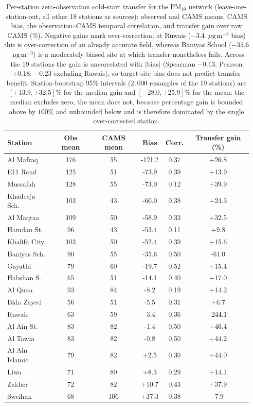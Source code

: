 \documentclass[11pt]{article}
\newcommand*{\ugm}{\ensuremath{\mu\mathrm{g\,m^{-3}}}}
\begin{document}
\begin{table}[htbp]\centering\footnotesize
\caption{Per-station zero-observation cold-start transfer for the PM$_{10}$ network (leave-one-station-out, all other 18 stations as sources): observed and CAMS means, CAMS bias, the observation--CAMS temporal correlation, and transfer gain over raw CAMS (\%). Negative gains mark over-correction; at Ruwais ($-3.4$~\ugm{} bias) this is over-correction of an already accurate field, whereas Baniyas School ($-35.6$~\ugm) is a moderately biased site at which transfer nonetheless fails. Across the 19 stations the gain is uncorrelated with $|$bias$|$ (Spearman $-0.13$, Pearson $+0.18$; $-0.23$ excluding Ruwais), so target-site bias does not predict transfer benefit. Station-bootstrap 95\% intervals ($2{,}000$ resamples of the 19 stations) are $[+13.9,+32.5]\%$ for the median gain and $[-28.0,+25.9]\%$ for the mean: the median excludes zero, the mean does not, because percentage gain is bounded above by $100\%$ and unbounded below and is therefore dominated by the single over-corrected station.}
\begin{tabular}{lccccc}\toprule
Station & Obs mean & CAMS mean & Bias & Corr. & Transfer gain (\%) \\ \midrule
Al Mafraq & 176 & 55 & -121.2 & 0.37 & +26.8 \\
E11 Road & 125 & 51 & -73.9 & 0.39 & +13.9 \\
Mussafah & 128 & 55 & -73.0 & 0.12 & +39.9 \\
Khadeeja Sch. & 103 & 43 & -60.0 & 0.38 & +24.3 \\
Al Maqtaa & 109 & 50 & -58.9 & 0.33 & +32.5 \\
Hamdan St. & 96 & 43 & -53.4 & 0.11 & +9.8 \\
Khalifa City & 103 & 50 & -52.4 & 0.39 & +15.6 \\
Baniyas Sch. & 90 & 55 & -35.6 & 0.50 & -61.0 \\
Gayathi & 79 & 60 & -19.7 & 0.52 & +15.4 \\
Habshan S. & 65 & 51 & -14.1 & 0.40 & +17.0 \\
Al Qua\textquotesingle{}a & 93 & 84 & -8.2 & 0.19 & +14.2 \\
Bida Zayed & 56 & 51 & -5.5 & 0.31 & +6.7 \\
Ruwais & 63 & 59 & -3.4 & 0.36 & -244.1 \\
Al Ain St. & 83 & 82 & -1.4 & 0.50 & +46.4 \\
Al Tawia & 83 & 82 & -0.8 & 0.50 & +44.2 \\
Al Ain Islamic & 79 & 82 & +2.5 & 0.30 & +44.0 \\
Liwa & 71 & 80 & +8.3 & 0.29 & +14.1 \\
Zakher & 72 & 82 & +10.7 & 0.43 & +37.9 \\
Sweihan & 68 & 106 & +37.3 & 0.38 & -7.9 \\
\bottomrule\end{tabular}\end{table}
\end{document}
